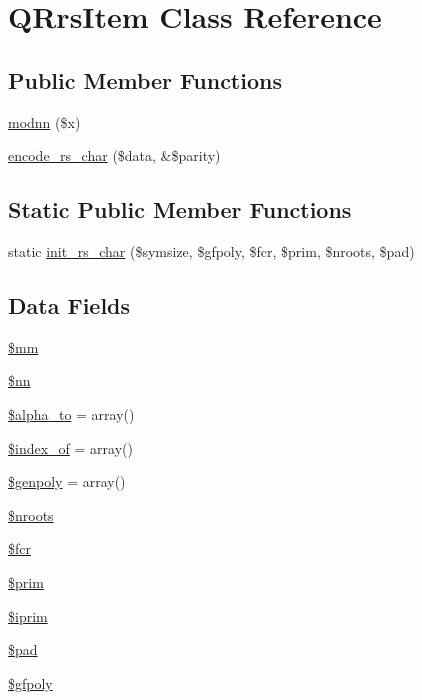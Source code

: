 \hypertarget{class_q_rrs_item}{\section{Q\-Rrs\-Item Class Reference}
\label{class_q_rrs_item}
}
\subsection*{Public Member Functions}
\begin{DoxyCompactItemize}
\item 
\hyperlink{class_q_rrs_item_ae38ed9bf65f9d957c411c530a94917a0}{modnn} (\$x)
\item 
\hyperlink{class_q_rrs_item_a231164e1e41207a89e18adc702fedcfe}{encode\-\_\-rs\-\_\-char} (\$data, \&\$parity)
\end{DoxyCompactItemize}
\subsection*{Static Public Member Functions}
\begin{DoxyCompactItemize}
\item 
static \hyperlink{class_q_rrs_item_a4c26d15cd42c49708069e589eed376de}{init\-\_\-rs\-\_\-char} (\$symsize, \$gfpoly, \$fcr, \$prim, \$nroots, \$pad)
\end{DoxyCompactItemize}
\subsection*{Data Fields}
\begin{DoxyCompactItemize}
\item 
\hyperlink{class_q_rrs_item_ae0e5a80c09d9f85b792c6972f3b86316}{\$mm}
\item 
\hyperlink{class_q_rrs_item_a14ed3575297e17e63b8dc152617588ca}{\$nn}
\item 
\hyperlink{class_q_rrs_item_a8b705b6f5ce315c9bd0a647244b1bef3}{\$alpha\-\_\-to} = array()
\item 
\hyperlink{class_q_rrs_item_a77a198ef4ad2f4d3a4fbc6a6758c9401}{\$index\-\_\-of} = array()
\item 
\hyperlink{class_q_rrs_item_a98f3f6ba946803baa34142d8a8843983}{\$genpoly} = array()
\item 
\hyperlink{class_q_rrs_item_a6442f3697f06124c64aaafe093d22e08}{\$nroots}
\item 
\hyperlink{class_q_rrs_item_a03722ee28e0d0a8d3b3ba704628495b0}{\$fcr}
\item 
\hyperlink{class_q_rrs_item_a19a932771222bd824b3fb9789a7bb336}{\$prim}
\item 
\hyperlink{class_q_rrs_item_a172d75cf5939fd6b6dce66823467e8b3}{\$iprim}
\item 
\hyperlink{class_q_rrs_item_a25f844f88387656d00fcdd1e816061da}{\$pad}
\item 
\hyperlink{class_q_rrs_item_a3eea518c204b9cf8f2e5c5842e28d877}{\$gfpoly}
\end{DoxyCompactItemize}


